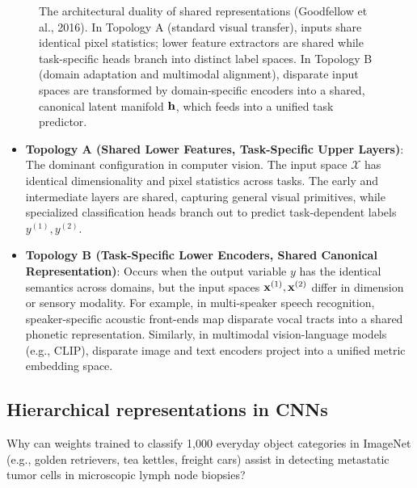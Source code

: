 \begin{figure}[H]
\caption{The architectural duality of shared representations (Goodfellow et al., 2016). In Topology A (standard visual transfer), inputs share identical pixel statistics; lower feature extractors are shared while task-specific heads branch into distinct label spaces. In Topology B (domain adaptation and multimodal alignment), disparate input spaces are transformed by domain-specific encoders into a shared, canonical latent manifold $\mathbf{h}$, which feeds into a unified task predictor.}
\label{fig:shared_representation_duality}
\end{figure}

\begin{itemize}[leftmargin=*]
  \item \textbf{Topology A (Shared Lower Features, Task-Specific Upper Layers)}: The dominant configuration in computer vision. The input space $\mathcal{X}$ has identical dimensionality and pixel statistics across tasks. The early and intermediate layers are shared, capturing general visual primitives, while specialized classification heads branch out to predict task-dependent labels $y^{(1)}, y^{(2)}$.
  \item \textbf{Topology B (Task-Specific Lower Encoders, Shared Canonical Representation)}: Occurs when the output variable $y$ has the identical semantics across domains, but the input spaces $\mathbf{x}^{(1)}, \mathbf{x}^{(2)}$ differ in dimension or sensory modality. For example, in multi-speaker speech recognition, speaker-specific acoustic front-ends map disparate vocal tracts into a shared phonetic representation. Similarly, in multimodal vision-language models (e.g., CLIP), disparate image and text encoders project into a unified metric embedding space.
\end{itemize}

\subsection{Hierarchical representations in CNNs}
\label{sec:hierarchical_visual_representations}

Why can weights trained to classify 1,000 everyday object categories in ImageNet (e.g., golden retrievers, tea kettles, freight cars) assist in detecting metastatic tumor cells in microscopic lymph node biopsies?

